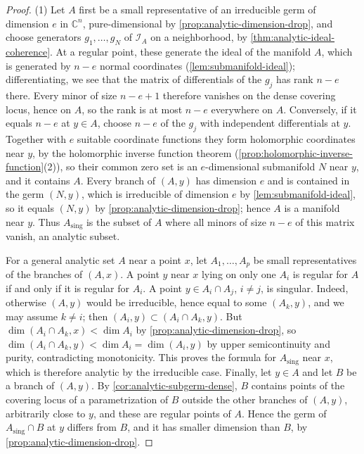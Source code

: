 \begin{proof}
(1) Let $A$ first be a small representative of an irreducible germ of dimension $e$ in $\mathbb C^n$, pure-dimensional by \cref{prop:analytic-dimension-drop}, and choose generators $g_1,\ldots,g_N$ of $\mathcal I_A$ on a neighborhood, by \cref{thm:analytic-ideal-coherence}. At a regular point, these generate the ideal of the manifold $A$, which is generated by $n-e$ normal coordinates (\cref{lem:submanifold-ideal}); differentiating, we see that the matrix of differentials of the $g_j$ has rank $n-e$ there. Every minor of size $n-e+1$ therefore vanishes on the dense covering locus, hence on $A$, so the rank is at most $n-e$ everywhere on $A$. Conversely, if it equals $n-e$ at $y\in A$, choose $n-e$ of the $g_j$ with independent differentials at $y$. Together with $e$ suitable coordinate functions they form holomorphic coordinates near $y$, by the holomorphic inverse function theorem (\cref{prop:holomorphic-inverse-function}(2)), so their common zero set is an $e$-dimensional submanifold $N$ near $y$, and it contains $A$. Every branch of $(A,y)$ has dimension $e$ and is contained in the germ $(N,y)$, which is irreducible of dimension $e$ by \cref{lem:submanifold-ideal}, so it equals $(N,y)$ by \cref{prop:analytic-dimension-drop}; hence $A$ is a manifold near $y$. Thus $A_{\mathrm{sing}}$ is the subset of $A$ where all minors of size $n-e$ of this matrix vanish, an analytic subset.

For a general analytic set $A$ near a point $x$, let $A_1,\ldots,A_p$ be small representatives of the branches of $(A,x)$. A point $y$ near $x$ lying on only one $A_i$ is regular for $A$ if and only if it is regular for $A_i$. A point $y\in A_i\cap A_j$, $i\neq j$, is singular. Indeed, otherwise $(A,y)$ would be irreducible, hence equal to some $(A_k,y)$, and we may assume $k\neq i$; then $(A_i,y)\subset(A_i\cap A_k,y)$. But $\dim(A_i\cap A_k,x)<\dim A_i$ by \cref{prop:analytic-dimension-drop}, so $\dim(A_i\cap A_k,y)<\dim A_i=\dim(A_i,y)$ by upper semicontinuity and purity, contradicting monotonicity. This proves the formula for $A_{\mathrm{sing}}$ near $x$, which is therefore analytic by the irreducible case. Finally, let $y\in A$ and let $B$ be a branch of $(A,y)$. By \cref{cor:analytic-subgerm-dense}, $B$ contains points of the covering locus of a parametrization of $B$ outside the other branches of $(A,y)$, arbitrarily close to $y$, and these are regular points of $A$. Hence the germ of $A_{\mathrm{sing}}\cap B$ at $y$ differs from $B$, and it has smaller dimension than $B$, by \cref{prop:analytic-dimension-drop}.


\end{proof}
